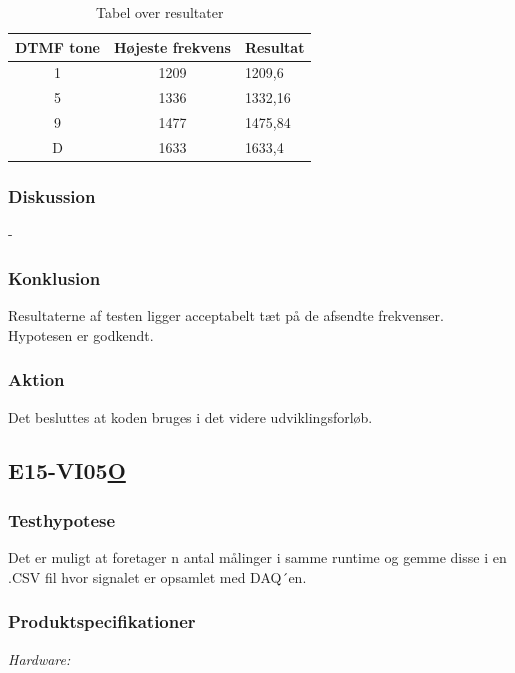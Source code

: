 			\begin{table}[htb]
				\centering
				\caption{Tabel over resultater}
				\label{SWhelmholtzresultater}
				\begin{tabular}{lll}
					\multicolumn{1}{l|}{\textbf{DTMF tone}} & 	
					\multicolumn{1}{l|}{\textbf{Højeste frekvens}} & \textbf{Resultat} \\ \hline
					\multicolumn{1}{c|}{1}& 
					\multicolumn{1}{c|}{1209}&1209,6\\
					\multicolumn{1}{c|}{5}& 
					\multicolumn{1}{c|}{1336}&1332,16\\
					\multicolumn{1}{c|}{9}& 
					\multicolumn{1}{c|}{1477}&1475,84\\
					\multicolumn{1}{c|}{D}& 
					\multicolumn{1}{c|}{1633}&1633,4\\
                   
				\end{tabular}
			\end{table}
	
		\subsubsection{Diskussion} 
		
		-
	
		\subsubsection{Konklusion}
		 
Resultaterne af testen ligger acceptabelt tæt på de afsendte frekvenser. Hypotesen er godkendt.
	
	    \subsubsection{Aktion}
	   Det besluttes at koden bruges i det videre udviklingsforløb.

\subsection{E15-VI05\underline{O}}
\subsubsection{Testhypotese}
Det er muligt at foretager n antal målinger i samme runtime og gemme disse i en .CSV fil hvor signalet er opsamlet med DAQ´en. 
\subsubsection{Produktspecifikationer}
\textit{Hardware:}\\
		\PC\\
		\daq\\
	
